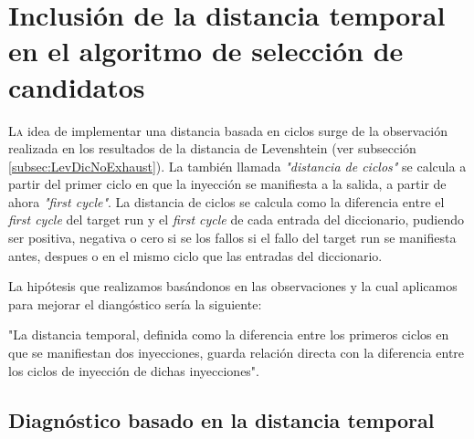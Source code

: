 \chapter{Inclusión de la distancia temporal en el algoritmo de selección de
candidatos}
\label{ch:Cycle}

\lettrine[lraise=-0.1, lines=2, loversize=0.2]{L}{a} idea de implementar una
distancia basada en ciclos surge de la observación realizada en los resultados de
la distancia de Levenshtein (ver subsección \ref{subsec:LevDicNoExhaust}). La
también llamada \textit{"distancia de ciclos"} se calcula a partir del primer 
ciclo en que la inyección se manifiesta a la salida, a partir de ahora 
\textit{"first cycle"}. La distancia de ciclos se calcula como la diferencia 
entre el \textit{first cycle} del target run y el \textit{first cycle} de cada 
entrada del diccionario, pudiendo ser positiva, negativa o cero si se los fallos 
si el fallo del target run se manifiesta antes, despues o en el mismo ciclo que 
las entradas del diccionario.

La hipótesis que realizamos basándonos en las observaciones y la cual aplicamos
para mejorar el diangóstico sería la siguiente:
\begin{hypothesis}\label{hyp:cycle}
    "La distancia temporal, definida como la diferencia entre los primeros ciclos
    en que se manifiestan dos inyecciones, guarda relación directa con la
    diferencia entre los ciclos de inyección de dichas inyecciones".
\end{hypothesis}






\section{Diagnóstico basado en la distancia temporal}
\label{sec:CycleCands}


